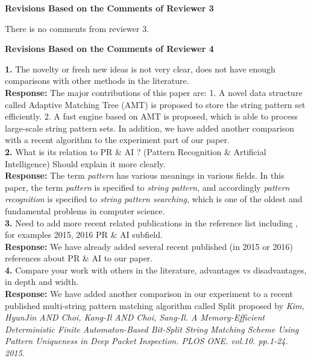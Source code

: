 \documentclass{paper}
\begin{document}
\begin{center}
\textbf{Revisions Based on the Comments of Reviewer 3}
\end{center}

There is no comments from reviewer 3.\\

\begin{center}
\textbf{Revisions Based on the Comments of Reviewer 4}
\end{center}

\textbf{1.} The novelty or fresh new ideas is not very clear, does not
have enough comparisons with other methods in the literature.\\[7pt]
\noindent \textbf{Response:} The major contributions of this paper
are: 1. A novel data structure called Adaptive Matching Tree (AMT) is
proposed to store the string pattern set efficiently. 2. A fast engine
based on AMT is proposed, which is able to process large-scale string
pattern sets. In addition, we have added another comparison with
a recent algorithm to the experiment part of our paper.\\

\textbf{2.} What is its relation to PR \& AI ? (Pattern Recognition \&
Artificial Intelligence) Should explain it more clearly.\\[7pt]
\noindent \textbf{Response:} The term \emph{pattern} has various
meanings in various fields. In this paper, the term \emph{pattern} is
specified to \emph{string pattern}, and accordingly \emph{pattern
  recognition} is specified to \emph{string pattern searching}, which
is one of the
oldest and fundamental problems in computer science.\\

\textbf{3.} Need to add more recent related publications in the
reference list including , for examples 2015, 2016 PR \& AI subfield.\\[7pt]
\noindent \textbf{Response:} We have already added several recent
published (in 2015 or 2016) references
about PR \& AI to our paper.\\

\textbf{4.} Compare your work with others in the literature,
advantages vs disadvantages, in depth and width.\\[7pt]
\noindent \textbf{Response:} We have added another comparison in our
experiment to a recent published multi-string pattern matching
algorithm called \textsf{Split} proposed by \emph{Kim, HyunJin AND
  Choi, Kang-Il AND Choi, Sang-Il. A Memory-Efficient Deterministic
  Finite Automaton-Based Bit-Split String Matching Scheme Using
  Pattern Uniqueness in Deep Packet
  Inspection. PLOS ONE. vol.10. pp.1-24. 2015.}\\
\end{document}
